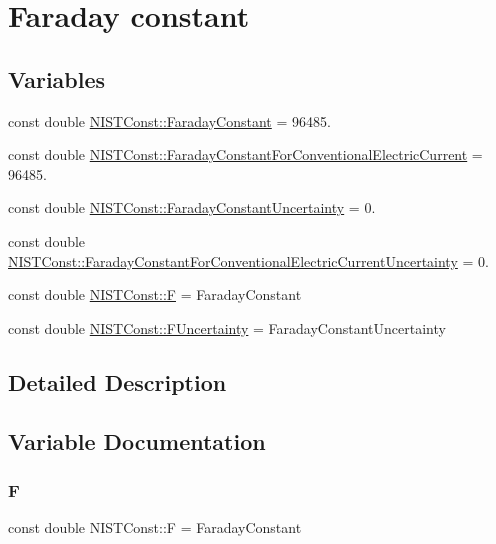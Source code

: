 \hypertarget{group___faraday_constant}{}\section{Faraday constant}
\label{group___faraday_constant}
\subsection*{Variables}
\begin{DoxyCompactItemize}
\item 
const double \hyperlink{group___faraday_constant_ga3a2104c5d85a6e687d615ec8004aa4c5}{N\+I\+S\+T\+Const\+::\+Faraday\+Constant} = 96485.
\item 
const double \hyperlink{group___faraday_constant_ga06079db2ebfcb103460b80a977171ac0}{N\+I\+S\+T\+Const\+::\+Faraday\+Constant\+For\+Conventional\+Electric\+Current} = 96485.
\item 
const double \hyperlink{group___faraday_constant_ga9b0f9181caac73b346e91602673272c1}{N\+I\+S\+T\+Const\+::\+Faraday\+Constant\+Uncertainty} = 0.
\item 
const double \hyperlink{group___faraday_constant_ga3b9280c2cf0f28e5ec6122b2f585eb81}{N\+I\+S\+T\+Const\+::\+Faraday\+Constant\+For\+Conventional\+Electric\+Current\+Uncertainty} = 0.
\item 
const double \hyperlink{group___faraday_constant_ga16166b57bc4bad7a648fbbc660ab88eb}{N\+I\+S\+T\+Const\+::F} = Faraday\+Constant
\item 
const double \hyperlink{group___faraday_constant_ga00c3ecdf32da676583d7f64f8a6a4e07}{N\+I\+S\+T\+Const\+::\+F\+Uncertainty} = Faraday\+Constant\+Uncertainty
\end{DoxyCompactItemize}


\subsection{Detailed Description}


\subsection{Variable Documentation}
\mbox{\label{group___faraday_constant_ga16166b57bc4bad7a648fbbc660ab88eb}} 
\subsubsection{\texorpdfstring{F}{F}}
{\footnotesize\ttfamily const double N\+I\+S\+T\+Const\+::F = Faraday\+Constant}

